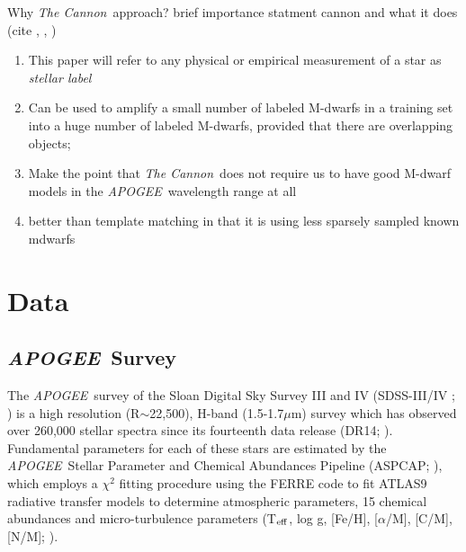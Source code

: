 \documentclass[modern]{aastex62}
\newcommand{\apogee}{\textsl{APOGEE}}
\newcommand{\thecannon}{\textsl{The Cannon}}
\begin{document}
Why \thecannon\ approach? brief importance statment cannon and what it does (cite \citealt{Ness:2015}, \citealt{Ho:2017a}, \citealt{Casey:2016}) 

\begin{enumerate}
\item This paper will refer to any physical or empirical measurement of a star as \emph{stellar label}

\item Can be used to amplify a small number of labeled M-dwarfs in a training set into a huge number of labeled M-dwarfs, provided that there are overlapping objects; 

\item Make the point that \thecannon\ does not require us to have good M-dwarf models in the \apogee\ wavelength range at all 

\item better than template matching in that it is using less sparsely sampled known mdwarfs
\end{enumerate}



\section{Data} \label{sec:data}

\subsection{\apogee\ Survey}


The \apogee\ survey \citep{Majewski:2015} of the Sloan Digital Sky Survey III and IV (SDSS-III/IV \citealt{Eisenstein:2011}; \citealt{Blanton:2017}) is a high resolution (R$\sim$22,500), H-band (1.5-1.7$\mu$m) survey which has observed over 260,000 stellar spectra since its fourteenth data release (DR14; \citealt{Abolfathi:2017}). Fundamental parameters for each of these stars are estimated by the \apogee\ Stellar Parameter and Chemical Abundances Pipeline (ASPCAP; \citealt{Perez:2016}), which employs a $\chi^2$ fitting procedure using the FERRE code to fit ATLAS9 radiative transfer models \citep{Castelli:2004} to determine atmospheric parameters, 15 chemical abundances and micro-turbulence parameters (T$_{\rm eff}$, log g, [Fe/H], [$\alpha$/M], [C/M], [N/M]; \citealt{Meszaros:2012}). 
\end{document}
